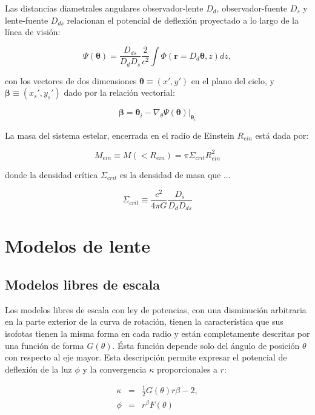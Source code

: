 Las distancias diametrales angulares observador-lente $D_d$, observador-fuente $D_s$ y lente-fuente $D_{ds}$ relacionan el potencial de deflexión proyectado a lo largo de la línea de visión:

\begin{equation}
\Psi ( \bm{\theta}) = \frac{D_{ds}}{D_{d} D_{s}} \frac{2}{c^2} \int \Phi ( \bm{r} = D_d \bm{\theta}, z) dz,
\end{equation}

con los vectores de dos dimensiones $\bm{\theta} \equiv (x', y')$ en el plano del cielo, y $\bm{\beta} \equiv (x_s', y_s')$ dado por la relación vectorial:

\begin{equation}
\bm{\beta} = \bm{\theta}_i - \nabla_{\theta} \Psi (\bm{\theta}) |_{\bm{\theta}_i}
\end{equation}


La masa del sistema estelar, encerrada en el radio de Einstein $R_{ein}$ está dada por:

\begin{equation}
M_{ein} \equiv M(<R_{ein}) = \pi \Sigma_{crit}R_{ein}^2
\end{equation}

donde la densidad crítica $\Sigma_{crit}$ es la densidad de masa que ...

\begin{equation}
\Sigma_{crit} \equiv \frac{c^2}{4 \pi G} \frac{D_s}{D_d D_{ds}}
\end{equation}


\section{Modelos de lente}

\subsection{Modelos libres de escala}

Los modelos libres de escala con ley de potencias, con una disminución arbitraria en la parte exterior de la curva de rotación, tienen la característica que sus isofotas tienen la misma forma en cada radio y están completamente descritas por una función de forma $G(\theta)$. Ésta función depende solo del ángulo de posición $\theta$ con respecto al eje mayor. Esta descripción permite expresar el potencial de deflexión de la luz $\phi$ y la convergencia $\kappa$ proporcionales a $r$:

\begin{eqnarray}
\kappa &=& \frac{1}{2} G(\theta) r{\beta-2}, \\
\phi &=& r^{\beta} F(\theta)
\end{eqnarray}

